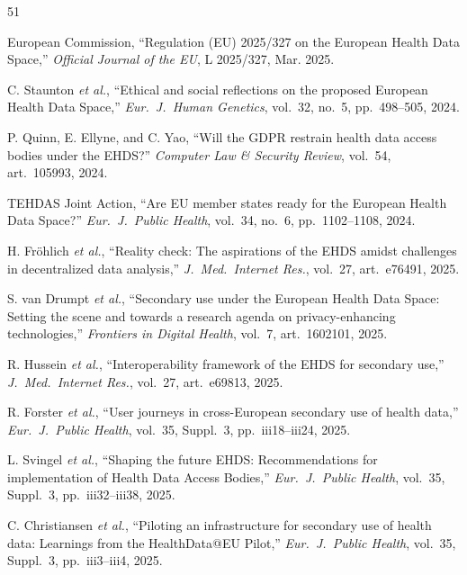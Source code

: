 \documentclass[conference,a4paper]{IEEEtran}
\begin{document}
\begin{thebibliography}{51}

European Commission, ``Regulation (EU) 2025/327 on the European Health Data Space,'' \textit{Official Journal of the EU}, L 2025/327, Mar. 2025.

C. Staunton \textit{et al.}, ``Ethical and social reflections on the proposed European Health Data Space,'' \textit{Eur.~J.~Human Genetics}, vol.~32, no.~5, pp.~498--505, 2024.

P. Quinn, E. Ellyne, and C. Yao, ``Will the GDPR restrain health data access bodies under the EHDS?'' \textit{Computer Law \& Security Review}, vol.~54, art.~105993, 2024.

TEHDAS Joint Action, ``Are EU member states ready for the European Health Data Space?'' \textit{Eur.~J.~Public Health}, vol.~34, no.~6, pp.~1102--1108, 2024.

H. Fr\"ohlich \textit{et al.}, ``Reality check: The aspirations of the EHDS amidst challenges in decentralized data analysis,'' \textit{J.~Med.~Internet Res.}, vol.~27, art.~e76491, 2025.

S. van Drumpt \textit{et al.}, ``Secondary use under the European Health Data Space: Setting the scene and towards a research agenda on privacy-enhancing technologies,'' \textit{Frontiers in Digital Health}, vol.~7, art.~1602101, 2025.

R. Hussein \textit{et al.}, ``Interoperability framework of the EHDS for secondary use,'' \textit{J.~Med.~Internet Res.}, vol.~27, art.~e69813, 2025.

R. Forster \textit{et al.}, ``User journeys in cross-European secondary use of health data,'' \textit{Eur.~J.~Public Health}, vol.~35, Suppl.~3, pp.~iii18--iii24, 2025.

L. Svingel \textit{et al.}, ``Shaping the future EHDS: Recommendations for implementation of Health Data Access Bodies,'' \textit{Eur.~J.~Public Health}, vol.~35, Suppl.~3, pp.~iii32--iii38, 2025.

C. Christiansen \textit{et al.}, ``Piloting an infrastructure for secondary use of health data: Learnings from the HealthData@EU Pilot,'' \textit{Eur.~J.~Public Health}, vol.~35, Suppl.~3, pp.~iii3--iii4, 2025.


\end{thebibliography}
\end{document}

